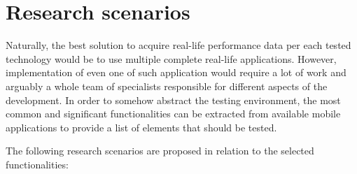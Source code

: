 \section{Research scenarios}\label{chap:research_scenarios}

Naturally, the best solution to acquire real-life performance data per each tested technology would be to use multiple complete real-life applications. However, implementation of even one of such application would require a lot of work and arguably a whole team of specialists responsible for different aspects of the development. In order to somehow abstract the testing environment, the most common and significant functionalities can be extracted from available mobile applications to provide a list of elements that should be tested.

\bigskip

The following research scenarios are proposed in relation to the selected functionalities:

